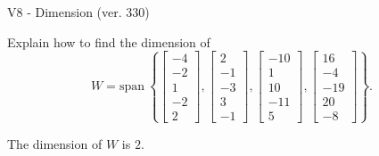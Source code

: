\begin{exercise}
  \begin{exerciseTitle}V8 - Dimension (ver. 330)\end{exerciseTitle}
  \begin{exerciseStatement}
    Explain how to find the dimension of 
\[W=\mathrm{span}\ \left\{\left[\begin{array}{r}
-4 \\
-2 \\
1 \\
-2 \\
2
\end{array}\right] , \left[\begin{array}{r}
2 \\
-1 \\
-3 \\
3 \\
-1
\end{array}\right] , \left[\begin{array}{r}
-10 \\
1 \\
10 \\
-11 \\
5
\end{array}\right] , \left[\begin{array}{r}
16 \\
-4 \\
-19 \\
20 \\
-8
\end{array}\right]\right\}.\]



  \end{exerciseStatement}
  \begin{exerciseAnswer}
   The dimension of \(W\) is  \(2\).
  


  \end{exerciseAnswer}
\end{exercise}